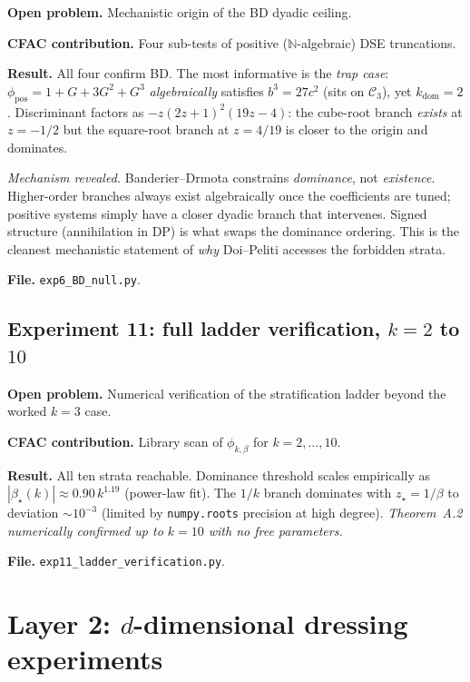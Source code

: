 \documentclass[11pt,a4paper]{article}
\theoremstyle{plain}
\newcommand{\NN}{\mathbb{N}}
\newcommand{\Ck}{\mathcal{C}}
\begin{document}
\textbf{Open problem.}  Mechanistic origin of the BD dyadic ceiling.

\textbf{CFAC contribution.}  Four sub-tests of positive ($\NN$-algebraic)
DSE truncations.

\textbf{Result.}  All four confirm BD.  The most informative is the
\emph{trap case}: $\phi_{\text{pos}} = 1 + G + 3G^{2} + G^{3}$
\emph{algebraically} satisfies $b^{3}=27c^{2}$ (sits on $\Ck_{3}$), yet
$k_{\text{dom}}=2$.  Discriminant factors as $-z(2z+1)^{2}(19z-4)$: the
cube-root branch \emph{exists} at $z=-1/2$ but the square-root branch at
$z=4/19$ is closer to the origin and dominates.

\emph{Mechanism revealed.}  Banderier--Drmota constrains \emph{dominance},
not \emph{existence}.  Higher-order branches always exist algebraically
once the coefficients are tuned; positive systems simply have a closer
dyadic branch that intervenes.  Signed structure (annihilation in DP) is
what swaps the dominance ordering.  This is the cleanest mechanistic
statement of \emph{why} Doi--Peliti accesses the forbidden strata.

\textbf{File.}  \texttt{exp6\_BD\_null.py}.

\subsection*{Experiment 11: full ladder verification, $k=2$ to $10$}

\textbf{Open problem.}  Numerical verification of the stratification ladder
beyond the worked $k=3$ case.

\textbf{CFAC contribution.}  Library scan of $\phi_{k,\beta}$ for
$k=2,\ldots,10$.

\textbf{Result.}  All ten strata reachable.  Dominance threshold scales
empirically as $|\beta_{\star}(k)| \approx 0.90\,k^{1.19}$ (power-law fit).
The $1/k$ branch dominates with $z_{\star}=1/\beta$ to deviation
$\sim 10^{-3}$ (limited by \texttt{numpy.roots} precision at high
degree).  \emph{Theorem~A.2 numerically confirmed up to $k=10$ with no
free parameters.}

\textbf{File.}  \texttt{exp11\_ladder\_verification.py}.

\section{Layer 2: $d$-dimensional dressing experiments}
\label{sec:layer2}
\end{document}
